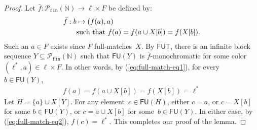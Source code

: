 \documentclass[10pt,a4paper]{amsart}
\newcommand{\FU}[0]{\mathsf{FU}} %
\newcommand{\FUT}[0]{\mathsf{FUT}}
\newcommand{\NN}[0]{\mathbb{N}}
\newcommand{\Pfin}{\mathcal{P}_{\mathtt{fin}}}
\begin{document}
\begin{proof}
Let $\bar f : \Pfin(\NN) \to \ell \times F$ be defined by:
\begin{align}\label{eq:full-match-eq1}
\bar f : b & \mapsto (f(a), a) \notag \\
& \text{such that } f(a) = f(a \cup X[b]) = f(X[b]).
\end{align}
Such an $a \in F$ exists since $F$ full-matches~$X$.
By $\FUT$, there is an infinite block sequence $Y \subseteq \Pfin(\NN)$ such that $\FU(Y)$ is $\bar f$-monochromatic for some color $(\ell^*, a) \in \ell \times F$. In other words, by (\ref{eq:full-match-eq1}), for every~$b \in \FU(Y)$,
\begin{align}\label{eq:full-match-eq2}
f(a) = f(a \cup X[b]) = f(X[b]) = \ell^*
\end{align}
Let $H = \{a\} \cup X[Y]$. For any element~$c \in \FU(H)$, either $c = a$, or $c = X[b]$ for some $b \in \FU(Y)$, or $c = a \cup X[b]$ for some~$b \in \FU(Y)$. In either case, by (\ref{eq:full-match-eq2}), $f(c) = \ell^*$. This completes our proof of the lemma.
\end{proof}
\end{document}
